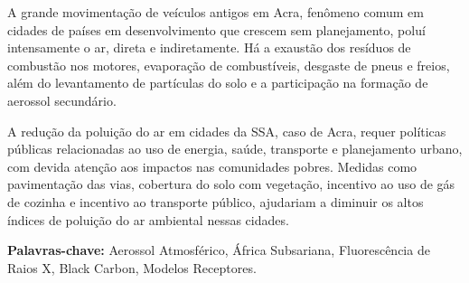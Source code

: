 A grande movimentação de veículos antigos em Acra, fenômeno comum em cidades de países em desenvolvimento que crescem sem planejamento, poluí intensamente o ar, direta e indiretamente. Há a exaustão dos resíduos de combustão nos motores, evaporação de combustíveis, desgaste de pneus e freios, além do levantamento de partículas do solo e a participação na formação de aerossol secundário. 

A redução da poluição do ar em cidades da SSA, caso de Acra, 
requer políticas públicas relacionadas ao uso de energia, saúde, 
transporte e planejamento urbano, com devida atenção 
aos impactos nas comunidades pobres. 
Medidas como pavimentação das vias, cobertura do solo com vegetação, 
incentivo ao uso de gás de cozinha e incentivo ao transporte público, 
ajudariam a diminuir os altos índices de poluição do ar ambiental nessas cidades.

\par
\vspace{1em}
\noindent\textbf{Palavras-chave:}  Aerossol Atmosférico, África Subsariana, Fluorescência de Raios X, Black Carbon, Modelos Receptores.
